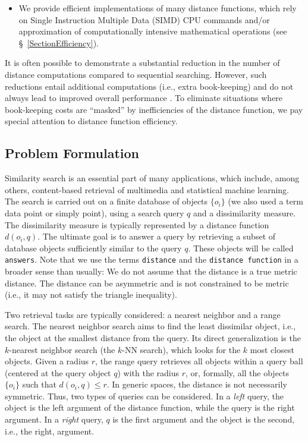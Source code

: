 \documentclass[runningheads,a4paper]{llncs}
\newcommand{\ttt}[1]{\texttt{#1}}
\newcommand{\knn}{$k$-NN }
\begin{document}
{\begin{itemize}
\item 
We provide efficient implementations of many distance functions,
which rely on Single Instruction Multiple Data (SIMD) CPU commands  and/or
approximation of computationally intensive mathematical operations (see \S~\ref{SectionEfficiency}). 
\end{itemize}

It is often possible to demonstrate a substantial reduction in the number of distance computations
compared to sequential searching.
However, such reductions entail additional computations (i.e., extra book-keeping)
and do not always lead to improved overall performance \cite{Boytsov_and_Bilegsaikhan:sisap2013}.
To eliminate situations where book-keeping costs are ``masked''
by inefficiencies of the distance function,
we pay special attention to distance function efficiency.

\subsection{Problem Formulation}
Similarity search is an essential part of many applications,
which include, among others,  
content-based retrieval of multimedia  and statistical machine learning.
The search is carried out on a finite database of objects $\{o_i\}$ (we also used a term data point or simply point),
using a search query $q$ and a dissimilarity measure.
The dissimilarity measure is typically represented by a distance function $d(o_i, q)$. 
The ultimate goal is to answer a query by retrieving a subset of database objects sufficiently similar to the query $q$.
These objects will be called \ttt{answers}.
Note that we use the terms \ttt{distance} and the \ttt{distance function} in a broader sense than
usually:
We do not assume that the distance is a true metric distance. 
The distance can be asymmetric and is not constrained to be metric (i.e., 
it may not satisfy the triangle inequality).

Two retrieval tasks are typically considered: a nearest neighbor and a range search. 
The nearest neighbor search aims to find the least dissimilar object,
i.e., the object at the smallest distance from the query.
Its direct generalization is the $k$-nearest neighbor search (the \knn search),
which looks for the $k$ most closest objects.
Given a radius $r$, 
the range query retrieves all objects within a query ball (centered at the query object $q$) with the radius $r$,
or, formally, all the objects~$\lbrace o_i \rbrace$ such that $d(o_i, q) \le r$. 
In generic spaces, the distance is not necessarily symmetric. 
Thus, two types of queries can be considered. 
In a  \emph{left} query, the object is the left argument of the distance function,
while the query is the right argument.
In a \emph{right} query, $q$ is the first argument and the object is the second, i.e.,
the right, argument.

}
\end{document}
